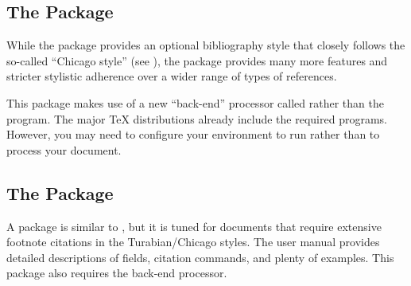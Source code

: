 \subsection{The  Package}
While the  package provides an optional bibliography style
that closely follows the so-called ``Chicago style''
(see \cite{Anonymous:1993:CMS}), the  package
provides many more features and stricter stylistic adherence over a
wider range of types of references.

This package makes use of a new ``back-end'' processor
called  rather than the \BibTeX{} program.  The
major \TeX{} distributions already include the required programs.
However, you may need to configure your environment to run 
rather than \BibTeX{} to process your document.

\subsection{The  Package}
A  package is similar to , but it
is tuned for documents that require extensive footnote citations in the
Turabian/Chicago styles.  The user manual provides detailed
descriptions of fields, citation commands, and plenty of examples.
This package also requires the  back-end processor.


